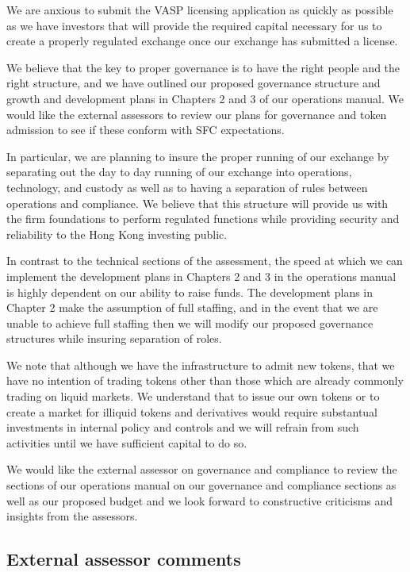 \documentclass[]{report}
\begin{document}
We are anxious to submit the VASP licensing application as quickly as
possible as we have investors that will provide the required capital
necessary for us to create a properly regulated exchange once our
exchange has submitted a license.

We believe that the key to proper governance is to have the right
people and the right structure, and we have outlined our proposed
governance structure and growth and development plans in Chapters 2
and 3 of our operations manual.  We would like the external assessors
to review our plans for governance and token admission to see if these
conform with SFC expectations.

In particular, we are planning to insure the proper running of our
exchange by separating out the day to day running of our exchange into
operations, technology, and custody as well as to having a separation
of rules between operations and compliance.  We believe that this
structure will provide us with the firm foundations to perform
regulated functions while providing security and reliability to the
Hong Kong investing public.

In contrast to the technical sections of the assessment, the speed at
which we can implement the development plans in Chapters 2 and 3 in
the operations manual is highly dependent on our ability to raise
funds.  The development plans in Chapter 2 make the assumption of full
staffing, and in the event that we are unable to achieve full staffing
then we will modify our proposed governance structures while insuring
separation of roles.

We note that although we have the infrastructure to admit new tokens,
that we have no intention of trading tokens other than those which are
already commonly trading on liquid markets.  We understand that to
issue our own tokens or to create a market for illiquid tokens and
derivatives would require substantual investments in internal policy
and controls and we will refrain from such activities until we have
sufficient capital to do so.

We would like the external assessor on governance and compliance to
review the sections of our operations manual on our governance and
compliance sections as well as our proposed budget and we look forward
to constructive criticisms and insights from the assessors.

\subsection{External assessor comments}
\end{document}
